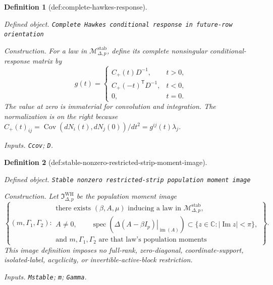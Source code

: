 \documentclass{article}
\newtheorem{definition}{Definition}
\begin{document}
\begin{definition}[def:complete-hawkes-response]\label{def:complete-hawkes-response}
\par\smallskip\noindent\emph{Defined object.} \texttt{Complete Hawkes conditional response in future-\allowbreak{}row orientation}
\par\smallskip\noindent\emph{Construction.} For a law in \(\mathcal M_{\Delta,p}^{\mathrm{stab}}\), define its complete nonsingular conditional-response matrix by
\[
 g(t)=
 \begin{cases}
 C_{+}(t)D^{-1},&t>0,\\
 C_{+}(-t)^{\mathsf T}D^{-1},&t<0,\\
 0,&t=0.
 \end{cases}
\]
The value at zero is immaterial for convolution and integration.  The normalization is on the right because \(C_{+}(t)_{ij}=\operatorname{Cov}(dN_i(t),dN_j(0))/dt^2=g^{ij}(t)\lambda_j\).
\par\smallskip\noindent\emph{Inputs.} \texttt{Ccov}; \texttt{D}.
\end{definition}

\begin{definition}[def:stable-nonzero-restricted-strip-moment-image]\label{def:stable-nonzero-restricted-strip-moment-image}
\par\smallskip\noindent\emph{Defined object.} \texttt{Stable nonzero restricted-\allowbreak{}strip population moment image}
\par\smallskip\noindent\emph{Construction.} Let \(\mathfrak I_{\Delta,p}^{\mathrm{WH}}\) be the population moment image
\[
 \left\{(m,\Gamma_1,\Gamma_2):\begin{array}{l}
 \text{there exists }(\beta,A,\mu)\text{ inducing a law in }\mathcal M_{\Delta,p}^{\mathrm{stab}},\\
 A\neq0,\qquad
 \operatorname{spec}\!\left(\left.\Delta(A-\beta I_p)\right|_{\operatorname{im}(A)}\right)
 \subset\{z\in\mathbb C:|\operatorname{Im}z|<\pi\},\\
 \text{and }m,\Gamma_1,\Gamma_2\text{ are that law's population moments}
 \end{array}\right\}.
\]
This image definition imposes no full-rank, zero-diagonal, coordinate-support, isolated-label, acyclicity, or invertible-active-block restriction.
\par\smallskip\noindent\emph{Inputs.} \texttt{Mstable}; \texttt{m}; \texttt{Gamma}.
\end{definition}
\end{document}
